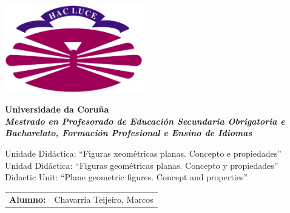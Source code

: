 %
%

%

\begin{titlepage}

  \begin{center}

    \includegraphics[width=6cm]{./eps/logo_udc.eps}
    \vspace{0.4cm}

    {\Large{\textbf{Universidade da Coruña}}} \\
    {\it \large{\textbf{Mestrado en Profesorado de Educación Secundaria Obrigatoria e Bacharelato, Formación Profesional e Ensino de Idiomas}}}
    \vspace{2cm}

    {\Huge Unidade Didáctica: ``Figuras xeométricas planas. Concepto e propiedades''} \\\vspace{0.4cm}
    {\large Unidad Didáctica: ``Figuras geométricas planas. Concepto y propiedades''} \\ \vspace{0.15cm}
    {\large Didactic Unit: ``Plane geometric figures. Concept and properties''}


  \end{center}

  \begin{bottompar}
    \begin{flushright}
      \begin{tabular}{rl}
        \large{\textbf{Alumno:}}
        & \large{Chavarría Teijeiro, Marcos} \\


\end{tabular}
\end{flushright}
\end{bottompar}
\end{titlepage}
